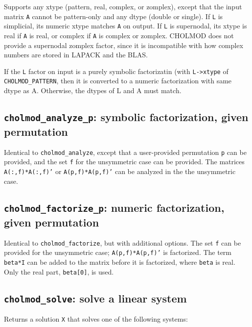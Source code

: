\documentclass[11pt]{article}
\begin{document}
Supports any xtype (pattern, real, complex, or zomplex), except that the input
matrix {\tt A} cannot be pattern-only and any dtype (double or single).  If
{\tt L} is simplicial, its numeric xtype matches {\tt A} on output.  If {\tt L}
is supernodal, its xtype is real if {\tt A} is real, or complex if {\tt A} is
complex or zomplex.  CHOLMOD does not provide a supernodal zomplex factor,
since it is incompatible with how complex numbers are stored in LAPACK and the
BLAS.

If the \verb'L' factor on input is a purely symbolic factorizatin (with
\verb'L->xtype' of \verb'CHOLMOD_PATTERN', then it is converted to a numeric
factorization with same dtype as A.  Otherwise, the dtypes of L and A must
match.

\subsection{{\tt cholmod\_analyze\_p}: symbolic factorization, given
permutation}


Identical to {\tt cholmod\_analyze}, except that a user-provided permutation
{\tt p} can be provided, and the set {\tt f} for the unsymmetric case can be
provided.  The matrices {\tt A(:,f)*A(:,f)'} or {\tt A(p,f)*A(p,f)'} can be
analyzed in the the unsymmetric case.

\subsection{{\tt cholmod\_factorize\_p}: numeric factorization, given
permutation}


Identical to {\tt cholmod\_factorize}, but with additional options.  The set
{\tt f} can be provided for the unsymmetric case; {\tt A(p,f)*A(p,f)'} is
factorized.  The term {\tt beta*I} can be added to the matrix before it is
factorized, where {\tt beta} is real.  Only the real part, {\tt beta[0]}, is
used.

\subsection{{\tt cholmod\_solve}: solve a linear system}


Returns a solution {\tt X} that solves one of the following systems:
\end{document}
